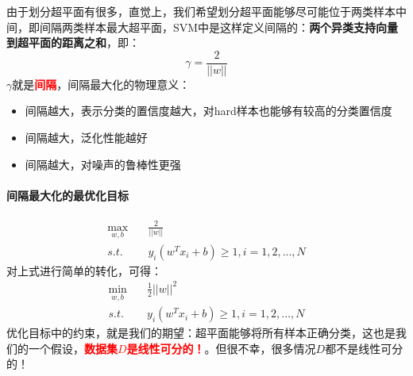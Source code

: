 由于划分超平面有很多，直觉上，我们希望划分超平面能够尽可能位于两类样本中间，即间隔两类样本最大超平面，SVM中是这样定义间隔的：\textbf{两个异类支持向量到超平面的距离之和}，即：
$$
\gamma = \frac{2}{||w||}
$$
$\gamma$就是\textbf{\textcolor{red}{间隔}}，间隔最大化的物理意义：
\begin{itemize}
	\item 间隔越大，表示分类的置信度越大，对hard样本也能够有较高的分类置信度
	\item 间隔越大，泛化性能越好
	\item 间隔越大，对噪声的鲁棒性更强
\end{itemize}


\paragraph{间隔最大化的最优化目标}
\begin{align}
	\mathop{max}_{w, b}&\quad \frac{2}{||w||} \nonumber \\
	s.t.&\quad y_i(w^T x_i + b) \geqslant 1, i = 1, 2, ..., N \nonumber
\end{align}
对上式进行简单的转化，可得：
\begin{align}
	\mathop{min}_{w, b}&\quad \frac{1}{2}||w||^2 \nonumber \\
	s.t.&\quad y_i(w^T x_i + b) \geqslant 1, i = 1, 2, ..., N \nonumber
\end{align}
优化目标中的约束，就是我们的期望：超平面能够将所有样本正确分类，这也是我们的一个假设，\textcolor{red}{\textbf{数据集$D$是线性可分的！}}。但很不幸，很多情况$D$都不是线性可分的！

